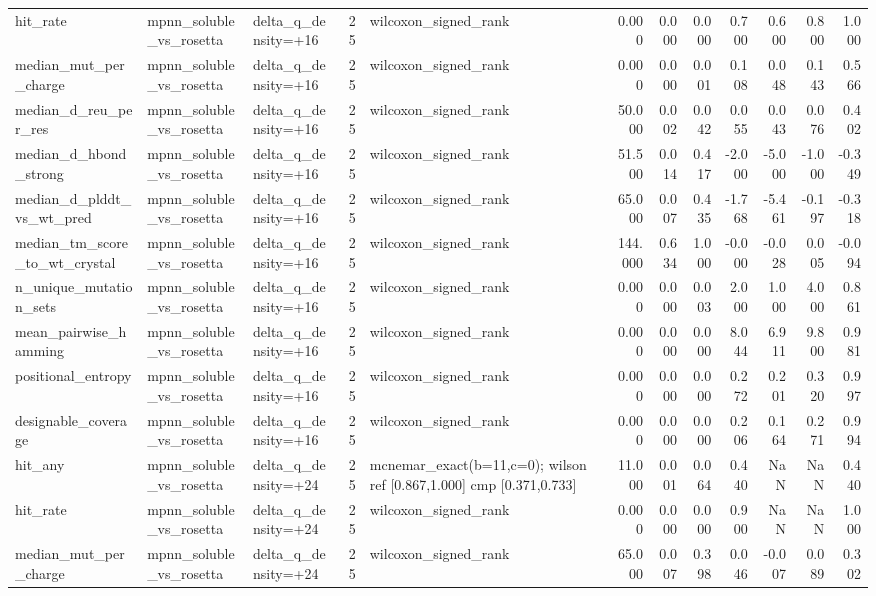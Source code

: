 \begin{table}
{\begin{tabular}{lllrlrrrrrrr}
hit\_rate & mpnn\_soluble\_vs\_rosetta & delta\_q\_density=+16 & 25 & wilcoxon\_signed\_rank & 0.000 & 0.000 & 0.000 & 0.700 & 0.600 & 0.800 & 1.000 \\
median\_mut\_per\_charge & mpnn\_soluble\_vs\_rosetta & delta\_q\_density=+16 & 25 & wilcoxon\_signed\_rank & 0.000 & 0.000 & 0.001 & 0.108 & 0.048 & 0.143 & 0.566 \\
median\_d\_reu\_per\_res & mpnn\_soluble\_vs\_rosetta & delta\_q\_density=+16 & 25 & wilcoxon\_signed\_rank & 50.000 & 0.002 & 0.042 & 0.055 & 0.043 & 0.076 & 0.402 \\
median\_d\_hbond\_strong & mpnn\_soluble\_vs\_rosetta & delta\_q\_density=+16 & 25 & wilcoxon\_signed\_rank & 51.500 & 0.014 & 0.417 & -2.000 & -5.000 & -1.000 & -0.349 \\
median\_d\_plddt\_vs\_wt\_pred & mpnn\_soluble\_vs\_rosetta & delta\_q\_density=+16 & 25 & wilcoxon\_signed\_rank & 65.000 & 0.007 & 0.435 & -1.768 & -5.461 & -0.197 & -0.318 \\
median\_tm\_score\_to\_wt\_crystal & mpnn\_soluble\_vs\_rosetta & delta\_q\_density=+16 & 25 & wilcoxon\_signed\_rank & 144.000 & 0.634 & 1.000 & -0.000 & -0.028 & 0.005 & -0.094 \\
n\_unique\_mutation\_sets & mpnn\_soluble\_vs\_rosetta & delta\_q\_density=+16 & 25 & wilcoxon\_signed\_rank & 0.000 & 0.000 & 0.003 & 2.000 & 1.000 & 4.000 & 0.861 \\
mean\_pairwise\_hamming & mpnn\_soluble\_vs\_rosetta & delta\_q\_density=+16 & 25 & wilcoxon\_signed\_rank & 0.000 & 0.000 & 0.000 & 8.044 & 6.911 & 9.800 & 0.981 \\
positional\_entropy & mpnn\_soluble\_vs\_rosetta & delta\_q\_density=+16 & 25 & wilcoxon\_signed\_rank & 0.000 & 0.000 & 0.000 & 0.272 & 0.201 & 0.320 & 0.997 \\
designable\_coverage & mpnn\_soluble\_vs\_rosetta & delta\_q\_density=+16 & 25 & wilcoxon\_signed\_rank & 0.000 & 0.000 & 0.000 & 0.206 & 0.164 & 0.271 & 0.994 \\
hit\_any & mpnn\_soluble\_vs\_rosetta & delta\_q\_density=+24 & 25 & mcnemar\_exact(b=11,c=0); wilson ref [0.867,1.000] cmp [0.371,0.733] & 11.000 & 0.001 & 0.064 & 0.440 & NaN & NaN & 0.440 \\
hit\_rate & mpnn\_soluble\_vs\_rosetta & delta\_q\_density=+24 & 25 & wilcoxon\_signed\_rank & 0.000 & 0.000 & 0.000 & 0.900 & NaN & NaN & 1.000 \\
median\_mut\_per\_charge & mpnn\_soluble\_vs\_rosetta & delta\_q\_density=+24 & 25 & wilcoxon\_signed\_rank & 65.000 & 0.007 & 0.398 & 0.046 & -0.007 & 0.089 & 0.302 \\

\end{tabular}}
\end{table}
